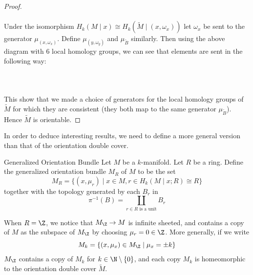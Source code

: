 \documentclass[a4paper]{article}
\begin{document}
\begin{lmm}{}{}
\begin{proof}
\\~\\
Under the isomorphism $H_k(M\;|\;x)\cong H_k(\widetilde{M}\;|\;(x,\omega_x))$ let $\omega_x$ be sent to the generator $\mu_{(x,\omega_x)}$. Define $\mu_{(y,\omega_y)}$ and $\mu_{\widetilde{B}}$ similarly. Then using the above diagram with 6 local homology groups, we can see that elements are sent in the following way: \\~\\
\\~\\
This show that we made a choice of generators for the local homology groups of $\widetilde{M}$ for which they are consistent (they both map to the same generator $\mu_{\widetilde{B}}$). Hence $\widetilde{M}$ is orientable. 
\end{proof}
\end{lmm}

In order to deduce interesting results, we need to define a more general version than that of the orientation double cover. 

\begin{defn}{Generalized Orientation Bundle}{} Let $M$ be a $k$-manifold. Let $R$ be a ring. Define the generalized orientation bundle $M_R$ of $M$ to be the set $$M_R=\{(x,\mu_r)\;|\;x\in M, r\in H_k(M\;|\; x;R)\cong R\}$$ together with the topology generated by each $B_r$ in $$\pi^{-1}(B)=\coprod_{r\in R\text{ is a unit}}B_r$$
\end{defn}

When $R=\Z$, we notice that $M_\Z\to M$ is infinite sheeted, and contains a copy of $M$ as the subspace of $M_\Z$ by choosing $\mu_r=0\in\Z$. More generally, if we write $$M_k=\{(x,\mu_x)\in M_\Z\;|\;\mu_x=\pm k\}$$ $M_\Z$ contains a copy of $M_k$ for $k\in\N\setminus\{0\}$, and each copy $M_k$ is homeomorphic to the orientation double cover $\widetilde{M}$. \\
\end{document}
